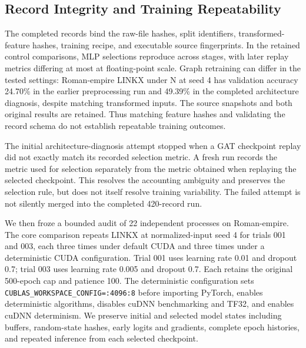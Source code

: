\subsection{Record Integrity and Training Repeatability}
\label{app:training_reproducibility}

The completed records bind the raw-file hashes, split identifiers, transformed-feature hashes, training recipe, and executable source fingerprints. In the retained control comparisons, MLP selections reproduce across stages, with later replay metrics differing at most at floating-point scale. Graph retraining can differ in the tested settings: Roman-empire LINKX under N at seed 4 has validation accuracy 24.70\% in the earlier preprocessing run and 49.39\% in the completed architecture diagnosis, despite matching transformed inputs. The source snapshots and both original results are retained. Thus matching feature hashes and validating the record schema do not establish repeatable training outcomes.

The initial architecture-diagnosis attempt stopped when a GAT checkpoint replay did not exactly match its recorded selection metric. A fresh run records the metric used for selection separately from the metric obtained when replaying the selected checkpoint. This resolves the accounting ambiguity and preserves the selection rule, but does not itself resolve training variability. The failed attempt is not silently merged into the completed 420-record run.

We then froze a bounded audit of 22 independent processes on Roman-empire. The core comparison repeats LINKX at normalized-input seed 4 for trials 001 and 003, each three times under default CUDA and three times under a deterministic CUDA configuration. Trial 001 uses learning rate 0.01 and dropout 0.7; trial 003 uses learning rate 0.005 and dropout 0.7. Each retains the original 500-epoch cap and patience 100. The deterministic configuration sets \texttt{CUBLAS\_WORKSPACE\_CONFIG=:4096:8} before importing PyTorch, enables deterministic algorithms, disables cuDNN benchmarking and TF32, and enables cuDNN determinism. We preserve initial and selected model states including buffers, random-state hashes, early logits and gradients, complete epoch histories, and repeated inference from each selected checkpoint.

